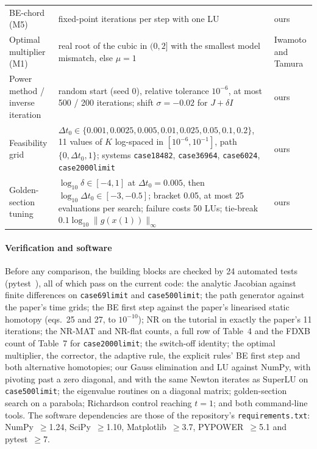 \documentclass[sigconf,nonacm]{acmart}
\newcommand{\ninf}[1]{\lVert #1\rVert_\infty}
\newcommand{\code}[1]{\texttt{#1}}
\begin{document}
\begin{table}[t]
\begin{tabularx}{\textwidth}{@{}>{\raggedright\arraybackslash}p{4.2cm} >{\raggedright\arraybackslash}X >{\raggedright\arraybackslash}p{4.2cm}@{}}
BE-chord (M5) & 3 fixed-point iterations per step with one LU & ours \\
Optimal multiplier (M1) & real root of the cubic in $(0,2]$ with the smallest model mismatch, else $\mu=1$ & Iwamoto and Tamura \\
Power method / inverse iteration & random start (seed 0), relative tolerance $10^{-6}$, at most 500 / 200 iterations; shift $\sigma=-0.02$ for $J+\delta I$ & ours \\
Feasibility grid & $\Delta t_0\in\{0.001,0.0025,0.005,0.01,0.025,0.05,0.1,0.2\}$, 11 values of $K$ log-spaced in $[10^{-6},10^{-1}]$, path $\{0,\Delta t_0,1\}$; systems \code{case18482}, \code{case36964}, \code{case6024}, \code{case2000limit} & ours \\
Golden-section tuning & $\log_{10}\delta\in[-4,1]$ at $\Delta t_0=0.005$, then $\log_{10}\Delta t_0\in[-3,-0.5]$; bracket 0.05, at most 25 evaluations per search; failure costs 50 LUs; tie-break $0.1\log_{10}\ninf{g(x(1))}$ & ours \\
\bottomrule
\end{tabularx}
\end{table}

\paragraph{Verification and software} Before any comparison, the building blocks are checked by 24
automated tests (pytest~\cite{pytest}), all of which pass on the current code: the analytic Jacobian
against finite differences on \code{case69limit} and \code{case500limit}; the path generator against the
paper's time grids; the BE first step against the paper's linearised static homotopy (eqs.~25 and 27, to
$10^{-10}$); NR on the tutorial in exactly the paper's 11 iterations; the NR-MAT and NR-flat counts, a full
row of Table~4 and the FDXB count of Table~7 for \code{case2000limit}; the switch-off identity; the optimal
multiplier, the corrector, the adaptive rule, the explicit rules' BE first step and both alternative
homotopies; our Gauss elimination and LU against NumPy, with pivoting past a zero diagonal, and with the
same Newton iterates as SuperLU on \code{case500limit}; the eigenvalue routines on a diagonal matrix;
golden-section search on a parabola; Richardson control reaching $t=1$; and both command-line tools. The
software dependencies are those of the repository's \code{requirements.txt}: NumPy~$\ge$1.24,
SciPy~$\ge$1.10, Matplotlib~$\ge$3.7, PYPOWER~$\ge$5.1 and pytest~$\ge$7.
\end{document}
